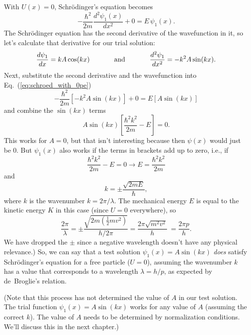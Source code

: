 With $U(x) = 0$, Schr\"odinger's equation becomes
\begin{equation}
-\frac{\hbar^2}{2m}\frac{d^2\psi_1(x)}{dx^2} + 0 = E\,\psi_1(x) .
\label{eq:schroed_with_0pe}
\end{equation}
The Schr\"odinger equation has the second derivative of the
wavefunction in it, so let's calculate that derivative for our trial
solution:
\begin{equation}
\frac{d\psi_1}{dx} = kA\cos(kx) \hspace{0.5in}  \mbox{and} \hspace{0.5in} 
\frac{d^2\psi_1}{dx^2} = -k^2A\sin(kx). \nonumber
\end{equation}
Next, substitute the second derivative and the wavefunction
into Eq.~(\ref{eq:schroed_with_0pe})
\begin{equation}
-\frac{\hbar^2}{2m}\left[-k^2A\sin(kx)\right] + 0 = E\left[A\sin(kx)\right] 
\end{equation}
and combine the $\sin(kx)$ terms
\begin{equation}
A\sin(kx)\left[\frac{\hbar^2k^2}{2m}-E\right] = 0.
\end{equation}
This works for $A=0$, but that isn't interesting because then $\psi(x)$ would
just be $0$. But $\psi_1(x)$ also works if the terms in brackets
add up to zero, i.e., if 
\begin{equation}
\frac{\hbar^2k^2}{2m} - E = 0 \longrightarrow E = \frac{\hbar^2k^2}{2m} 
\end{equation}
and
\begin{equation}
k=\pm\frac{\sqrt{2mE}}{\hbar},
\end{equation}
where $k$ is the wavenumber $k=2\pi/\lambda$.  The mechanical energy $E$ is
equal to the kinetic energy $K$ in this case (since $U = 0$ everywhere), so
\begin{equation}
\frac{2\pi}{\lambda}=\pm \frac{\sqrt{2m\left(\frac{1}{2}mv^2\right)}}{h/2\pi} 
= \frac{2\pi\sqrt{m^2v^2}}{h} \
= \frac{2\pi p}{h}. 
\end{equation}
We have dropped the $\pm$ since a negative wavelength doesn't have any
physical relevance.)  So, we can say that a test solution $\psi_1(x) =
A\sin(kx)$ {\it does} satisfy Schr\"odinger's equation for a free particle
($U = 0$), assuming the wavenumber $k$ has a value that corresponds to
a wavelength $\lambda = h/p$, as expected by de~Broglie's relation.

(Note that this process has not determined the value of $A$ in our test
solution.  The trial function $\psi_1(x) = A\sin(kx)$ works for any value
of $A$ (assuming the correct $k$). The value of $A$ needs to be determined
by normalization conditions. We'll discuss this in the next chapter.)

